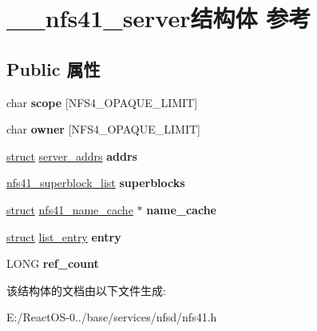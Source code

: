 \hypertarget{struct____nfs41__server}{}\section{\+\_\+\+\_\+nfs41\+\_\+server结构体 参考}
\label{struct____nfs41__server}
\subsection*{Public 属性}
\begin{DoxyCompactItemize}
\item 
\mbox{\label{struct____nfs41__server_a23b8e57d1898ec9f5f16f7329dd9528b}} 
char {\bfseries scope} \mbox{[}N\+F\+S4\+\_\+\+O\+P\+A\+Q\+U\+E\+\_\+\+L\+I\+M\+IT\mbox{]}
\item 
\mbox{\label{struct____nfs41__server_aa7616bb0416593cbc02d0343fed776df}} 
char {\bfseries owner} \mbox{[}N\+F\+S4\+\_\+\+O\+P\+A\+Q\+U\+E\+\_\+\+L\+I\+M\+IT\mbox{]}
\item 
\mbox{\label{struct____nfs41__server_a385ac026a0b84b9930cbb0927009eeec}} 
\hyperlink{interfacestruct}{struct} \hyperlink{structserver__addrs}{server\+\_\+addrs} {\bfseries addrs}
\item 
\mbox{\label{struct____nfs41__server_a28536bcde36b61e0ab4dd7d2825dba20}} 
\hyperlink{struct____nfs41__superblock__list}{nfs41\+\_\+superblock\+\_\+list} {\bfseries superblocks}
\item 
\mbox{\label{struct____nfs41__server_ae6e37a436de320aecba9c747d968345b}} 
\hyperlink{interfacestruct}{struct} \hyperlink{structnfs41__name__cache}{nfs41\+\_\+name\+\_\+cache} $\ast$ {\bfseries name\+\_\+cache}
\item 
\mbox{\label{struct____nfs41__server_af505c320c592316308b7f90e53471641}} 
\hyperlink{interfacestruct}{struct} \hyperlink{structlist__entry}{list\+\_\+entry} {\bfseries entry}
\item 
\mbox{\label{struct____nfs41__server_af182a29820fcf82bdb06505e00ea6c9b}} 
L\+O\+NG {\bfseries ref\+\_\+count}
\end{DoxyCompactItemize}


该结构体的文档由以下文件生成\+:\begin{DoxyCompactItemize}
\item 
E\+:/\+React\+O\+S-\/0../base/services/nfsd/nfs41.\+h\end{DoxyCompactItemize}
